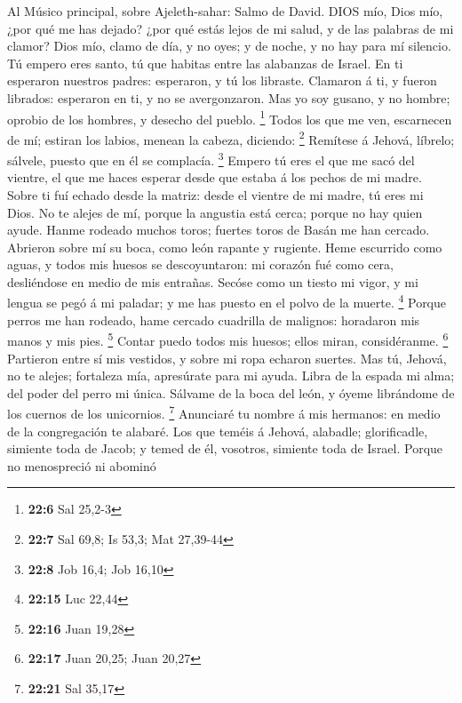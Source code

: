  Al Músico principal, sobre Ajeleth-sahar: Salmo de David.
DIOS mío, Dios mío, ¿por qué me has dejado? ¿por qué estás lejos de mi
salud, y de las palabras de mi clamor?  Dios mío, clamo de
día, y no oyes; y de noche, y no hay para mí silencio.  Tú
empero eres santo, tú que habitas entre las alabanzas de Israel.
 En ti esperaron nuestros padres: esperaron, y tú los
libraste.  Clamaron á ti, y fueron librados: esperaron en
ti, y no se avergonzaron.  Mas yo soy gusano, y no hombre;
oprobio de los hombres, y desecho del pueblo. \footnote{\textbf{22:6}
  Sal 25,2-3}  Todos los que me ven, escarnecen de mí;
estiran los labios, menean la cabeza, diciendo: \footnote{\textbf{22:7}
  Sal 69,8; Is 53,3; Mat 27,39-44}  Remítese á Jehová,
líbrelo; sálvele, puesto que en él se complacía. \footnote{\textbf{22:8}
  Job 16,4; Job 16,10}  Empero tú eres el que me sacó del
vientre, el que me haces esperar desde que estaba á los pechos de mi
madre.  Sobre ti fuí echado desde la matriz: desde el
vientre de mi madre, tú eres mi Dios.  No te alejes de mí,
porque la angustia está cerca; porque no hay quien ayude. 
Hanme rodeado muchos toros; fuertes toros de Basán me han cercado.
 Abrieron sobre mí su boca, como león rapante y rugiente.
 Heme escurrido como aguas, y todos mis huesos se
descoyuntaron: mi corazón fué como cera, desliéndose en medio de mis
entrañas.  Secóse como un tiesto mi vigor, y mi lengua se
pegó á mi paladar; y me has puesto en el polvo de la muerte. \footnote{\textbf{22:15}
  Luc 22,44}  Porque perros me han rodeado, hame cercado
cuadrilla de malignos: horadaron mis manos y mis pies. \footnote{\textbf{22:16}
  Juan 19,28}  Contar puedo todos mis huesos; ellos miran,
considéranme. \footnote{\textbf{22:17} Juan 20,25; Juan 20,27}
 Partieron entre sí mis vestidos, y sobre mi ropa echaron
suertes.  Mas tú, Jehová, no te alejes; fortaleza mía,
apresúrate para mi ayuda.  Libra de la espada mi alma; del
poder del perro mi única.  Sálvame de la boca del león, y
óyeme librándome de los cuernos de los unicornios. \footnote{\textbf{22:21}
  Sal 35,17}  Anunciaré tu nombre á mis hermanos: en medio
de la congregación te alabaré.  Los que teméis á Jehová,
alabadle; glorificadle, simiente toda de Jacob; y temed de él, vosotros,
simiente toda de Israel.  Porque no menospreció ni abominó
